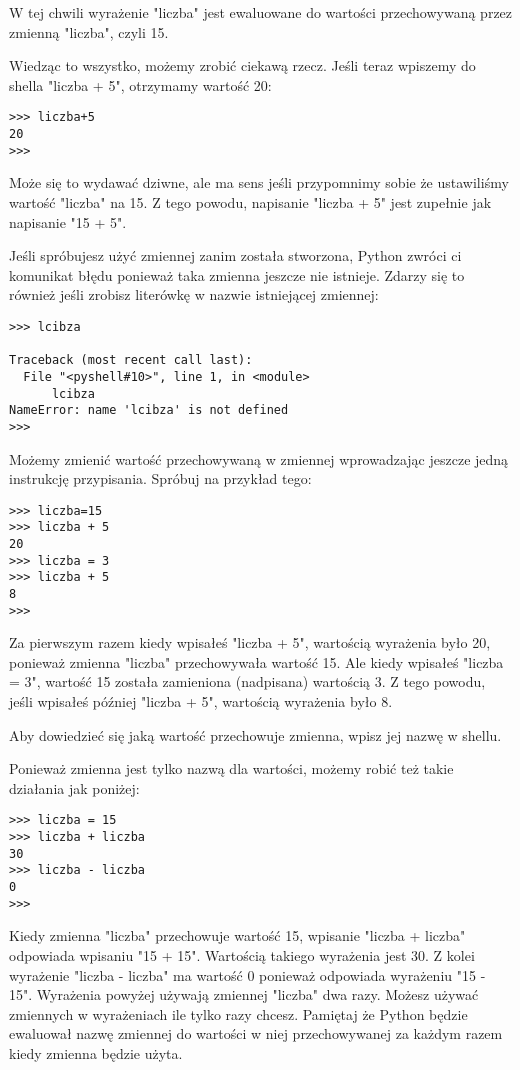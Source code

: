\documentclass{book}
\begin{document}
W tej chwili wyrażenie "liczba" jest ewaluowane do wartości przechowywaną przez zmienną "liczba", czyli 15.

Wiedząc to wszystko, możemy zrobić ciekawą rzecz. Jeśli teraz wpiszemy do shella "liczba + 5", otrzymamy wartość 20:

\begin{lstlisting}
>>> liczba+5
20
>>> 
\end{lstlisting}

Może się to wydawać dziwne, ale ma sens jeśli przypomnimy sobie że ustawiliśmy wartość "liczba" na 15. Z tego powodu, napisanie "liczba + 5" jest zupełnie jak napisanie "15 + 5".

Jeśli spróbujesz użyć zmiennej zanim została stworzona, Python zwróci ci komunikat błędu ponieważ taka zmienna jeszcze nie istnieje. Zdarzy się to również jeśli zrobisz literówkę w nazwie istniejącej zmiennej:


\begin{lstlisting}
>>> lcibza

Traceback (most recent call last):
  File "<pyshell#10>", line 1, in <module>
      lcibza
NameError: name 'lcibza' is not defined
>>> 
\end{lstlisting}

Możemy zmienić wartość przechowywaną w zmiennej wprowadzając jeszcze jedną instrukcję przypisania. Spróbuj na przykład tego:

\begin{lstlisting}
>>> liczba=15
>>> liczba + 5
20
>>> liczba = 3
>>> liczba + 5
8
>>> 
\end{lstlisting}

Za pierwszym razem kiedy wpisałeś "liczba + 5", wartością wyrażenia było 20, ponieważ zmienna "liczba" przechowywała wartość 15. Ale kiedy wpisałeś "liczba = 3", wartość 15 została zamieniona (nadpisana) wartością 3. Z tego powodu, jeśli wpisałeś później "liczba + 5", wartością wyrażenia było 8.

Aby dowiedzieć się jaką wartość przechowuje zmienna, wpisz jej nazwę w shellu.

Ponieważ zmienna jest tylko nazwą dla wartości, możemy robić też takie działania jak poniżej:

\begin{lstlisting}
>>> liczba = 15
>>> liczba + liczba
30
>>> liczba - liczba
0
>>> 
\end{lstlisting}

Kiedy zmienna "liczba" przechowuje wartość 15, wpisanie "liczba + liczba" odpowiada wpisaniu "15 + 15". Wartością takiego wyrażenia jest 30. Z kolei wyrażenie "liczba - liczba" ma wartość 0 ponieważ odpowiada wyrażeniu "15 - 15". Wyrażenia powyżej używają zmiennej "liczba" dwa razy. Możesz używać zmiennych w wyrażeniach ile tylko razy chcesz. Pamiętaj że Python będzie ewaluował nazwę zmiennej do wartości w niej przechowywanej za każdym razem kiedy zmienna będzie użyta.
\end{document}
